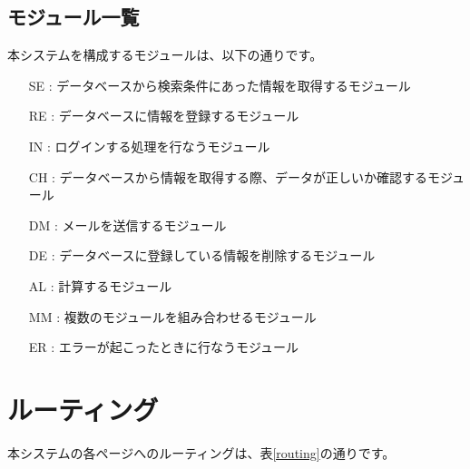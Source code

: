 \documentclass[a4j,titlepage]{jarticle}
\begin{document}
\subsection{モジュール一覧}
本システムを構成するモジュールは、以下の通りです。
\begin{enumerate}
\item [SE] : データベースから検索条件にあった情報を取得するモジュール
\item [RE] : データベースに情報を登録するモジュール
\item [IN] : ログインする処理を行なうモジュール
\item [CH] : データベースから情報を取得する際、データが正しいか確認するモジュール
\item [DM] : メールを送信するモジュール
\item [DE] : データベースに登録している情報を削除するモジュール
\item [AL] : 計算するモジュール
\item [MM] : 複数のモジュールを組み合わせるモジュール
\item [ER] : エラーが起こったときに行なうモジュール
\end{enumerate}

\clearpage

\section{ルーティング}
本システムの各ページへのルーティングは、表\ref{routing}の通りです。
\end{document}
